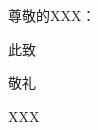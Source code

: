 \documentclass[12pt]{article}
\begin{document}







{\Large \noindent 尊敬的XXX：}

\vspace{1em}
\large 
\setlength\parindent{2em}

\lipsum

\vspace{2em}

此致

\noindent 敬礼

\vspace{2em}

\begin{flushright}
XXX

\zhtoday
\end{flushright}

\end{document}
